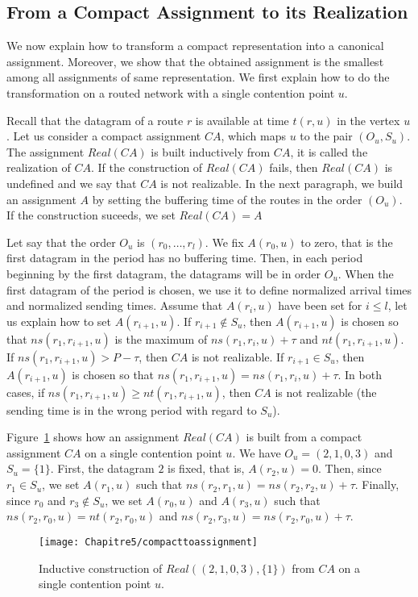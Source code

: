 \subsection{From a Compact Assignment to its Realization}\label{sec:real}


We now explain how to transform a compact representation into a canonical assignment.
Moreover, we show that the obtained assignment is the smallest among all assignments of same representation. We first explain how to do the transformation on a routed network with a single contention point $u$.

Recall that the datagram of a route $r$ is available at time $t(r,u)$ in the vertex $u$.
Let us consider a compact assignment $CA$, which maps $u$ to the pair $(O_u,S_u)$.
The assignment $Real(CA)$ is built inductively from $CA$, it is called the realization of $CA$. 
If the construction of $Real(CA)$ fails, then $Real(CA)$ is undefined and we say that $CA$ is not realizable. In the next paragraph, we build an assignment $A$ by setting the buffering time of the routes in the order
 $(O_u)$. If the construction suceeds, we set $Real(CA) = A$ 

Let say that the order $O_u$ is $(r_0, \dots, r_l)$. We fix $A(r_0,u)$ to zero, that is the first
datagram in the period has no buffering time. Then, in each period beginning by the first datagram, the datagrams will be in order $O_u$. When the first datagram of the period is chosen, we use it to define normalized arrival times and normalized sending times.
Assume that $A(r_i,u)$ have been set for $i \leq l$, let us explain how to 
set $A(r_{i+1},u)$. If $r_{i+1} \notin S_u$, then $A(r_{i+1},u)$ is chosen so that $ns(r_1,r_{i+1},u)$ is the maximum of $ns(r_1,r_i,u) + \tau$ and $nt(r_1,r_{i+1},u)$. If $ns(r_1,r_{i+1},u) > P - \tau$, then $CA$ is not realizable. If $r_{i+1} \in S_u$, then $A(r_{i+1},u)$ is chosen so that $ns(r_1, r_{i+1},u) = ns(r_1,r_i,u) + \tau$. In both cases, if $ns(r_1, r_{i+1},u) \geq nt(r_1,r_{i+1},u)$, then $CA$ is not realizable (the sending time is in the wrong period with regard to $S_u$). 

Figure~\ref{fig:compacttoassignment} shows how an assignment $Real(CA)$ is built from a compact assignment $CA$ on a single contention point $u$. We have $O_u = (2,1,0,3)$ and $S_u = \{1\}$. First, the datagram $2$ is fixed, that is, $A(r_2,u)=0$. Then, since $r_1 \in S_u$, we set $A(r_1,u)$ such that $ ns(r_2,r_1,u) = ns(r_2,r_2,u) + \tau$. 
Finally, since $r_0$ and $r_3 \notin S_u$, we set $A(r_0,u)$ and $A(r_3,u)$ such that $ns(r_2,r_0,u) = nt(r_2,r_0,u)$ and  $ns(r_2,r_3,u) = ns(r_2,r_0,u) + \tau$.
\begin{figure}[!h]
	\centering
	\texttt{[image: Chapitre5/compacttoassignment]}
\caption{Inductive construction of $Real((2,1,0,3),\{1\})$ from $CA$ on a single contention point $u$. }
\label{fig:compacttoassignment} 
\end{figure}

